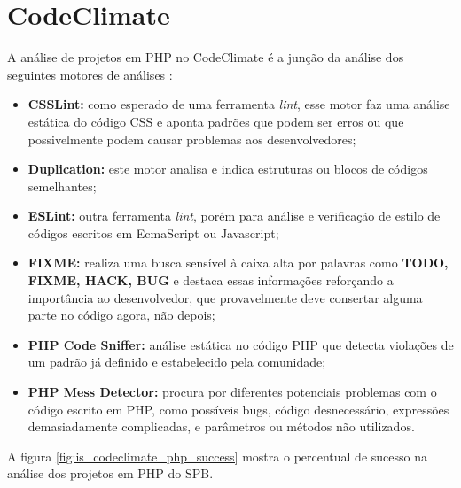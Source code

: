 \section{CodeClimate}

A análise de projetos em PHP no CodeClimate é a junção da análise dos seguintes
motores de análises \cite{enginesCodeClimate}:

\begin{itemize}
  \item \textbf{CSSLint:} como esperado de uma ferramenta \textit{lint}, esse
	motor faz uma análise estática do código CSS e aponta padrões que podem ser
	erros ou que possivelmente podem causar problemas aos desenvolvedores;
	\item \textbf{Duplication:} este motor analisa e indica estruturas ou blocos
	de códigos semelhantes;
	\item \textbf{ESLint:} outra ferramenta \textit{lint}, porém para análise e
	verificação de estilo de códigos escritos em EcmaScript ou Javascript;
	\item \textbf{FIXME:} realiza uma busca sensível à caixa alta por palavras
	como \textbf{TODO, FIXME, HACK, BUG} e destaca essas informações reforçando a
	importância ao desenvolvedor, que provavelmente deve consertar alguma parte no
	código agora, não depois;
	\item \textbf{PHP Code Sniffer:} análise estática no código PHP que detecta
	violações de um padrão já definido e estabelecido pela comunidade;
	\item \textbf{PHP Mess Detector:} procura por diferentes potenciais problemas
	com o código escrito em PHP, como possíveis bugs, código desnecessário,
	expressões demasiadamente complicadas, e parâmetros ou métodos não utilizados.
\end{itemize}

A figura \ref{fig:is_codeclimate_php_success} mostra o percentual de sucesso na
análise dos projetos em PHP do SPB.

